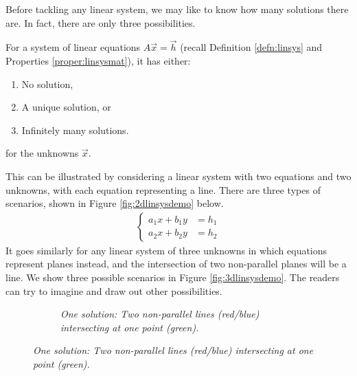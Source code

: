 Before tackling any linear system, we may like to know how many solutions there are. In fact, there are only three possibilities.
\begin{thm}
For a system of linear equations $A\vec{x} = \vec{h}$ (recall Definition \ref{defn:linsys} and Properties \ref{proper:linsysmat}), it has either:
\begin{enumerate}
\item No solution,
\item A unique solution, or
\item Infinitely many solutions.
\end{enumerate}
for the unknowns $\vec{x}$.
\end{thm}
This can be illustrated by considering a linear system with two equations and two unknowns, with each equation representing a line. There are three types of scenarios, shown in Figure \ref{fig:2dlinsysdemo} below.
\begin{align}
\label{eqn:2dlinsysdemo}
\left\{\begin{alignedat}{1}
a_1x + b_1y &= h_1 \\
a_2x + b_2y &= h_2
\end{alignedat}\right.
\end{align}
It goes similarly for any linear system of three unknowns in which equations represent planes instead, and the intersection of two non-parallel planes will be a line. We show three possible scenarios in Figure \ref{fig:3dlinsysdemo}. The readers can try to imagine and draw out other possibilities.
\begin{figure}[h!]
\centering
\begin{subfigure}{0.7\textwidth}
\centering
{} 
\caption{\textit{One solution: Two non-parallel lines (red/blue) intersecting at one point (green).}}
\end{subfigure}
\end{figure}
